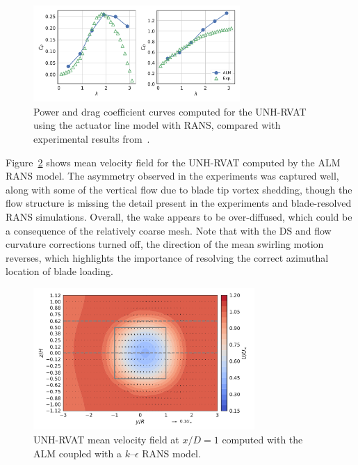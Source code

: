 \documentclass[times]{weauth}
\begin{document}

\begin{figure}
    \centering

    \includegraphics[width=0.7\textwidth]{RVAT-ALM_perf-curves}

    \caption{Power and drag coefficient curves computed for the UNH-RVAT using
        the actuator line model with RANS, compared with experimental results
        from~\cite{Bachant2016-RVAT-Re-dep}.}

    \label{fig:RVAT-ALM-perf-curves}
\end{figure}

Figure~\ref{fig:RVAT-ALM-meancontquiv} shows mean velocity field for the
UNH-RVAT computed by the ALM RANS model. The asymmetry observed in the
experiments \cite{Bachant2015-JoT} was captured well, along with some of the
vertical flow due to blade tip vortex shedding, though the flow structure is
missing the detail present in the experiments and blade-resolved RANS
simulations. Overall, the wake appears to be over-diffused, which could be a
consequence of the relatively coarse mesh. Note that with the DS and flow
curvature corrections turned off, the direction of the mean swirling motion
reverses, which highlights the importance of resolving the correct azimuthal
location of blade loading.

\begin{figure}
    \centering

    \includegraphics[width=0.75\textwidth]{RVAT-ALM_meancontquiv}

    \caption{UNH-RVAT mean velocity field at $x/D=1$ computed with the ALM
        coupled with a $k$--$\epsilon$ RANS model.}

    \label{fig:RVAT-ALM-meancontquiv}
\end{figure}
\end{document}

